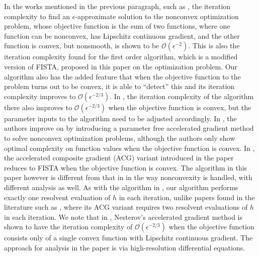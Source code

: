 \documentclass[11pt]{article}
\begin{document}
\noindent In the works mentioned in the previous paragraph, such as \cite{Ghadimi, Liang3}, the iteration complexity to find an $\epsilon$-approximate solution to the nonconvex optimization problem, whose objective function is the sum of two functions, where one function can be nonconvex, has Lipschitz continuous gradient, and the other function is convex, but nonsmooth, is shown to be $\mathcal{O}(\epsilon^{-2})$.  This is also the iteration complexity found for the first order algorithm, which is a modified version of FISTA, proposed in this paper on the optimization problem.   Our algorithm also has the added feature that when the objective function to the problem turns out to be convex, it is able to ``detect'' this and its iteration complexity improves to $\mathcal{O}(\epsilon^{-2/3})$.  In \cite{Ghadimi}, the iteration complexity of the algorithm there also improves to $\mathcal{O}(\epsilon^{-2/3})$ when the objective function is convex, but the parameter inputs to the algorithm need to be adjusted accordingly.  In \cite{Ghadimi2}, the authors improve on \cite{Ghadimi} by introducing a parameter free accelerated gradient method to solve nonconvex optimization problems, although the authors only show optimal complexity on function values when the objective function is convex.   In \cite{Liang3}, the accelerated composite gradient (ACG) variant introduced in the paper reduces to FISTA when the objective function is convex.   The algorithm in this paper however is different from that in \cite{Liang3} in the way nonconvexity is handled, with different analysis as well.  As with the algorithm in \cite{Liang3}, our algorithm performs exactly one resolvent evaluation of $h$ in each iteration, unlike  papers found in the literature such as \cite{Ghadimi}, where its ACG variant requires two resolvent evaluations of $h$ in each iteration.   We note that in \cite{Shi},  Nesterov's accelerated gradient method is shown to have the iteration complexity of $\mathcal{O}(\epsilon^{-2/3})$ when the objective function consists only of a single  convex function with Lipschitz continuous gradient.  The approach for analysis in the paper is via high-resolution differential equations.

\vspace{10pt}
\end{document}
